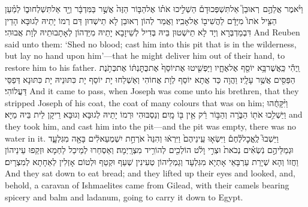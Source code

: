 {וַיֹּ֨אמֶר אֲלֵהֶ֣ם \pasek  רְאוּבֵן֮ אַל\maqqaf תִּשְׁפְּכוּ\maqqaf דָם֒ הַשְׁלִ֣יכוּ אֹת֗וֹ אֶל\maqqaf הַבּ֤וֹר הַזֶּה֙ אֲשֶׁ֣ר בַּמִּדְבָּ֔ר וְיָ֖ד אַל\maqqaf תִּשְׁלְחוּ\maqqaf ב֑וֹ לְמַ֗עַן הַצִּ֤יל אֹתוֹ֙ מִיָּדָ֔ם לַהֲשִׁיב֖וֹ אֶל\maqqaf אָבִֽיו׃}
{וַאֲמַר לְהוֹן רְאוּבֵן לָא תֵישְׁדוּן דַּם רְמוֹ יָתֵיהּ לְגוּבָּא הָדֵין דִּבְמַדְבְּרָא וְיָד לָא תֵישְׁטוּן בֵּיהּ בְּדִיל לְשֵׁיזָבָא יָתֵיהּ מִיַּדְהוֹן לְאָתָבוּתֵיהּ לְוָת אֲבוּהִי׃}
{And Reuben said unto them: ‘Shed no blood; cast him into this pit that is in the wilderness, but lay no hand upon him’—that he might deliver him out of their hand, to restore him to his father.}{}
{וַֽיְהִ֕י כַּֽאֲשֶׁר\maqqaf בָּ֥א יוֹסֵ֖ף אֶל\maqqaf אֶחָ֑יו וַיַּפְשִׁ֤יטוּ אֶת\maqqaf יוֹסֵף֙ אֶת\maqqaf כֻּתׇּנְתּ֔וֹ אֶת\maqqaf כְּתֹ֥נֶת הַפַּסִּ֖ים אֲשֶׁ֥ר עָלָֽיו׃}
{וַהֲוָה כַּד אֲתָא יוֹסֵף לְוָת אֲחוֹהִי וְאַשְׁלַחוּ יָת יוֹסֵף יָת כִּתּוּנֵיהּ יָת כִּתּוּנָא דְּפַסֵּי דַּעֲלוֹהִי׃}
{And it came to pass, when Joseph was come unto his brethren, that they stripped Joseph of his coat, the coat of many colours that was on him;}{}
{וַיִּ֨קָּחֻ֔הוּ וַיַּשְׁלִ֥כוּ אֹת֖וֹ הַבֹּ֑רָה וְהַבּ֣וֹר רֵ֔ק אֵ֥ין בּ֖וֹ מָֽיִם׃}
{וְנַסְבּוּהִי וּרְמוֹ יָתֵיהּ לְגוּבָּא וְגוּבָּא רֵיקָן לֵית בֵּיהּ מַיָּא׃}
{and they took him, and cast him into the pit—and the pit was empty, there was no water in it.}{}
{וַיֵּשְׁבוּ֮ לֶֽאֱכׇל\maqqaf לֶ֒חֶם֒ וַיִּשְׂא֤וּ עֵֽינֵיהֶם֙ וַיִּרְא֔וּ וְהִנֵּה֙ אֹרְחַ֣ת יִשְׁמְעֵאלִ֔ים בָּאָ֖ה מִגִּלְעָ֑ד וּגְמַלֵּיהֶ֣ם נֹֽשְׂאִ֗ים נְכֹאת֙ וּצְרִ֣י וָלֹ֔ט הוֹלְכִ֖ים לְהוֹרִ֥יד מִצְרָֽיְמָה׃}
{וְאַסְחַרוּ לְמֵיכַל לַחְמָא וּזְקַפוּ עֵינֵיהוֹן וַחֲזוֹ וְהָא שְׁיָרַת עַרְבָּאֵי אָתְיָא מִגִּלְעָד וְגַמְלֵיהוֹן טְעִינִין שְׁעַף וּקְטַף וּלְטוֹם אָזְלִין לְאַחָתָא לְמִצְרָיִם׃}
{And they sat down to eat bread; and they lifted up their eyes and looked, and, behold, a caravan of Ishmaelites came from Gilead, with their camels bearing spicery and balm and ladanum, going to carry it down to Egypt.}{}
